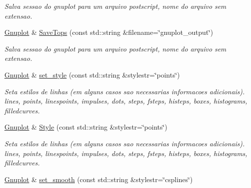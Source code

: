 \begin{DoxyCompactItemize}
\begin{DoxyCompactList}\small\item\em Salva sessao do gnuplot para um arquivo postscript, nome do arquivo sem extensao. \end{DoxyCompactList}\item 
\hypertarget{classGnuplot_a5adf74dfda6d9d70a16c435fedf07625}{\hyperlink{classGnuplot}{Gnuplot} \& \hyperlink{classGnuplot_a5adf74dfda6d9d70a16c435fedf07625}{Save\-Tops} (const std\-::string \&filename=\char`\"{}gnuplot\-\_\-output\char`\"{})}\label{classGnuplot_a5adf74dfda6d9d70a16c435fedf07625}

\begin{DoxyCompactList}\small\item\em Salva sessao do gnuplot para um arquivo postscript, nome do arquivo sem extensao. \end{DoxyCompactList}\item 
\hypertarget{classGnuplot_acfdcda292650775ebed4683e8e1515b5}{\hyperlink{classGnuplot}{Gnuplot} \& \hyperlink{classGnuplot_acfdcda292650775ebed4683e8e1515b5}{set\-\_\-style} (const std\-::string \&stylestr=\char`\"{}points\char`\"{})}\label{classGnuplot_acfdcda292650775ebed4683e8e1515b5}

\begin{DoxyCompactList}\small\item\em Seta estilos de linhas (em alguns casos sao necessarias informacoes adicionais). lines, points, linespoints, impulses, dots, steps, fsteps, histeps, boxes, histograms, filledcurves. \end{DoxyCompactList}\item 
\hypertarget{classGnuplot_ae64e911770994ba05cc2f6dcbfe31540}{\hyperlink{classGnuplot}{Gnuplot} \& \hyperlink{classGnuplot_ae64e911770994ba05cc2f6dcbfe31540}{Style} (const std\-::string \&stylestr=\char`\"{}points\char`\"{})}\label{classGnuplot_ae64e911770994ba05cc2f6dcbfe31540}

\begin{DoxyCompactList}\small\item\em Seta estilos de linhas (em alguns casos sao necessarias informacoes adicionais). lines, points, linespoints, impulses, dots, steps, fsteps, histeps, boxes, histograms, filledcurves. \end{DoxyCompactList}\item 
\hypertarget{classGnuplot_aa18386919da2ec4c994f1f9c7195d384}{\hyperlink{classGnuplot}{Gnuplot} \& \hyperlink{classGnuplot_aa18386919da2ec4c994f1f9c7195d384}{set\-\_\-smooth} (const std\-::string \&stylestr=\char`\"{}csplines\char`\"{})}\label{classGnuplot_aa18386919da2ec4c994f1f9c7195d384}


\end{DoxyCompactItemize}
